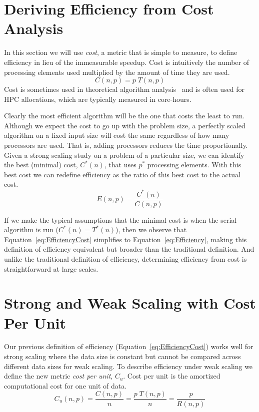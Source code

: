 \documentclass{llncs}
\newcommand*{\lcite}[1]{~\cite{#1}}
\newcommand*{\keyterm}[1]{\emph{#1}}
\begin{document}
\section{Deriving Efficiency from Cost Analysis}
\label{sec:CostAnalysis}

\noindent
In this section we will use \keyterm{cost}, a metric that is simple to
measure, to define efficiency in lieu of the immeasurable speedup. Cost is
intuitively the number of processing elements used multiplied by the amount
of time they are used.
\begin{equation}
  C(n,p) = p \; T(n,p)
  \label{eq:Cost}
\end{equation}
Cost is sometimes used in theoretical algorithm analysis\lcite{JaJa1992}
and is often used for HPC allocations, which are typically measured in
core-hours.

Clearly the most efficient algorithm will be the one that costs the least
to run. Although we expect the cost to go up with the problem size, a
perfectly scaled algorithm on a fixed input size will cost the same
regardless of how many processors are used. That is, adding processors
reduces the time proportionally. Given a strong scaling study on a problem
of a particular size, we can identify the best (minimal) cost, $C^*(n)$,
that uses $p^*$ processing elements. With this best cost we can redefine
efficiency as the ratio of this best cost to the actual cost.
\begin{equation}
  E(n,p) = \frac{C^*(n)}{C(n,p)}
  \label{eq:EfficiencyCost}
\end{equation}

If we make the typical assumptions that the minimal cost is when the serial
algorithm is run ($C^*(n) = T^*(n)$), then we observe that
Equation~\ref{eq:EfficiencyCost} simplifies to
Equation~\ref{eq:Efficiency}, making this definition of efficiency
equivalent but broader than the traditional definition. And unlike the
traditional definition of efficiency, determining efficiency from cost is
straightforward at large scales.


\section{Strong and Weak Scaling with Cost Per Unit}
\label{sec:CostPerUnit}

\noindent
Our previous definition of efficiency (Equation~\ref{eq:EfficiencyCost})
works well for strong scaling where the data size is constant but cannot
be compared across different data sizes for weak scaling. To describe
efficiency under weak scaling we define the new metric \keyterm{cost per
  unit}, $C_u$. Cost per unit is the amortized computational cost for
one unit of data.
\begin{equation}
  C_u(n,p) = \frac{C(n,p)}{n} = \frac{p \; T(n,p)}{n}
  = \frac{p}{R(n,p)}
  \label{eq:CostPerUnit}
\end{equation}
\end{document}

